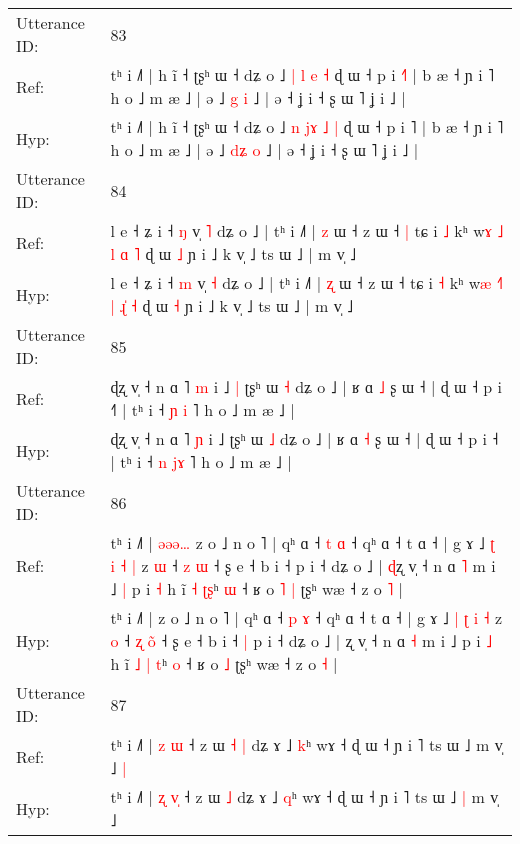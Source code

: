 \documentclass[10pt]{article}
\DeclareRobustCommand{\hl}[1]{{\textcolor{red}{#1}}}
\begin{document}
\begin{longtable}{ll}
 \\
\midrule
Utterance ID: & 83 \\
Ref: & tʰ i ˩˥ | h ĩ ˧ ʈʂʰ ɯ ˧ dʑ o ˩ \hl{|} \hl{}\hl{l} \hl{e} \hl{˧} ɖ ɯ ˧ p i \hl{˧}˥ | b æ ˧ ɲ i ˥ h o ˩ m æ ˩ | ə ˩ \hl{}\hl{g} \hl{i} ˩ | ə ˧ ʝ i ˧ ʂ ɯ ˥ ʝ i ˩ |
 \\
Hyp: & tʰ i ˩˥ | h ĩ ˧ ʈʂʰ ɯ ˧ dʑ o ˩ \hl{n} \hl{j}\hl{ɤ} \hl{˩} \hl{|} ɖ ɯ ˧ p i \hl{}˥ | b æ ˧ ɲ i ˥ h o ˩ m æ ˩ | ə ˩ \hl{d}\hl{ʑ} \hl{o} ˩ | ə ˧ ʝ i ˧ ʂ ɯ ˥ ʝ i ˩ |
 \\
\midrule
Utterance ID: & 84 \\
Ref: & l e ˧ ʑ i ˧ \hl{ŋ} v̩ \hl{˥} dʑ o ˩ | tʰ i ˩˥ | \hl{z} ɯ ˧ z ɯ ˧\hl{ }\hl{|} tɕ i \hl{˩} kʰ w\hl{ɤ} \hl{}\hl{˩} \hl{l} \hl{}\hl{ɑ} \hl{˥} ɖ ɯ \hl{˩} ɲ i ˩ k v̩ ˩ ts ɯ ˩ | m v̩ ˩
 \\
Hyp: & l e ˧ ʑ i ˧ \hl{m} v̩ \hl{˧} dʑ o ˩ | tʰ i ˩˥ | \hl{ʐ} ɯ ˧ z ɯ ˧\hl{}\hl{} tɕ i \hl{˧} kʰ w\hl{æ} \hl{˧}\hl{˥} \hl{|} \hl{ɻ}\hl{̍} \hl{˧} ɖ ɯ \hl{˧} ɲ i ˩ k v̩ ˩ ts ɯ ˩ | m v̩ ˩
 \\
\midrule
Utterance ID: & 85 \\
Ref: & ɖʐ v̩ ˧ n ɑ ˥ \hl{m} i ˩\hl{ }\hl{|} ʈʂʰ ɯ \hl{˧} dʑ o ˩ | ʁ ɑ \hl{˩} ʂ ɯ ˧ | ɖ ɯ ˧ p i ˧\hl{˥} | tʰ i ˧ \hl{ɲ} \hl{}\hl{i} ˥ h o ˩ m æ ˩ |
 \\
Hyp: & ɖʐ v̩ ˧ n ɑ ˥ \hl{ɲ} i ˩\hl{}\hl{} ʈʂʰ ɯ \hl{˩} dʑ o ˩ | ʁ ɑ \hl{˧} ʂ ɯ ˧ | ɖ ɯ ˧ p i ˧\hl{} | tʰ i ˧ \hl{n} \hl{j}\hl{ɤ} ˥ h o ˩ m æ ˩ |
 \\
\midrule
Utterance ID: & 86 \\
Ref: & tʰ i ˩˥ |\hl{ }\hl{ə}\hl{ə}\hl{ə}\hl{…} z o ˩ n o ˥ | qʰ ɑ ˧ \hl{t} \hl{ɑ} ˧ qʰ ɑ ˧ t ɑ ˧ | g ɤ ˩ \hl{ʈ} \hl{i} \hl{˧} \hl{|} z \hl{ɯ} ˧ \hl{z} \hl{}\hl{ɯ} ˧ ʂ e ˧ b i ˧\hl{}\hl{} p i ˧ dʑ o ˩ | \hl{ɖ}ʐ v̩ ˧ n ɑ \hl{˥} m i ˩\hl{ }\hl{|} p i \hl{˧} h ĩ \hl{˧} \hl{}\hl{ʈ}\hl{ʂ}ʰ \hl{ɯ} ˧ ʁ o\hl{ }\hl{˥} \hl{|} ʈʂʰ wæ ˧ z o \hl{˥} |
 \\
Hyp: & tʰ i ˩˥ |\hl{}\hl{}\hl{}\hl{}\hl{} z o ˩ n o ˥ | qʰ ɑ ˧ \hl{p} \hl{ɤ} ˧ qʰ ɑ ˧ t ɑ ˧ | g ɤ ˩ \hl{|} \hl{ʈ} \hl{i} \hl{˧} z \hl{o} ˧ \hl{ʐ} \hl{o}\hl{̃} ˧ ʂ e ˧ b i ˧\hl{ }\hl{|} p i ˧ dʑ o ˩ | \hl{}ʐ v̩ ˧ n ɑ \hl{˧} m i ˩\hl{}\hl{} p i \hl{˩} h ĩ \hl{˩} \hl{|}\hl{ }\hl{t}ʰ \hl{o} ˧ ʁ o\hl{}\hl{} \hl{˩} ʈʂʰ wæ ˧ z o \hl{˧} |
 \\
\midrule
Utterance ID: & 87 \\
Ref: & tʰ i ˩˥ | \hl{z} \hl{}\hl{ɯ} ˧ z ɯ\hl{ }\hl{˧} \hl{|} dʑ ɤ ˩ \hl{k}ʰ wɤ ˧ ɖ ɯ ˧ ɲ i ˥ ts ɯ ˩\hl{}\hl{} m v̩ ˩\hl{ }\hl{|}
 \\
Hyp: & tʰ i ˩˥ | \hl{ʐ} \hl{v}\hl{̩} ˧ z ɯ\hl{}\hl{} \hl{˩} dʑ ɤ ˩ \hl{q}ʰ wɤ ˧ ɖ ɯ ˧ ɲ i ˥ ts ɯ ˩\hl{ }\hl{|} m v̩ ˩\hl{}\hl{}

\end{longtable}
\end{document}
